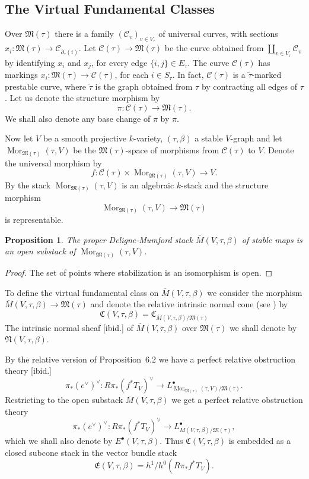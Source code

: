 \documentclass[11pt]{article}
\newcommand{\CC}{\mathfrak{C}}
\newcommand{\EE}{\mathfrak{E}}
\newcommand{\MM}{\mathfrak{M}}
\DeclareMathOperator{\Mor}{Mor}
\newcommand{\NN}{\mathfrak{N}}
\newcommand{\cC}{\mathcal{C}}
\newcommand{\com}{^{\scriptscriptstyle\bullet}}
\newcommand{\del}{\partial}
\newcommand{\dual}[1]{{{#1}^{\vee}}}
\newcommand{\lst}{_{\ast}}
\newcommand{\ol}{\overline}
\renewcommand{\t}{_{\tau}}
\renewcommand{\tilde}{\widetilde}
\newcommand{\upst}{^{\ast}}
\theoremstyle{plain}
\newtheorem{prop}{Proposition}
\theoremstyle{remark}
\newenvironment{pf}{\begin{proof}}{\end{proof}}
\theoremstyle{plain}
\theoremstyle{definition}
\theoremstyle{remark}
\begin{document}
\subsection{The Virtual Fundamental Classes}

Over \(\MM(\tau)\) there is a family \((\cC_v)_{v\in V_{\tau}}\) of universal
curves, with sections
\(x_i:\MM(\tau)\rightarrow\cC_{\del\t(i)}\). Let \(\cC(\tau)\rightarrow\MM(\tau)\)
be the curve obtained from \(\coprod_{v\in V\t}\cC_v\) by identifying \(x_i\) and
\(x_j\), for every edge \(\{i,j\}\in E\t\). The curve \(\cC(\tau)\) has markings
\(x_i:\MM(\tau)\rightarrow\cC(\tau)\), for each \(i\in S\t\). In fact,
\(\cC(\tau)\) is a \(\tilde{\tau}\)-marked prestable curve, where \(\tilde{\tau}\) is
the graph obtained from \(\tau\) by contracting all edges of \(\tau\). Let us
denote
the structure morphism by
\[
\pi:\cC(\tau)\longrightarrow\MM(\tau).
\]
We shall also denote any base change
of \(\pi\) by \(\pi\).

Now let \(V\) be a smooth projective \(k\)-variety, \((\tau,\beta)\) a stable
\(V\)-graph and let
\(\Mor_{\MM(\tau)}(\tau,V)\) be the \(\MM(\tau)\)-space of morphisms
{}from \(\cC(\tau)\) to
\(V\). Denote the universal morphism by
\[
f:\cC(\tau)\times\Mor_{\MM(\tau)}(\tau,V)\longrightarrow V.
\]
By
\cite{fgaIV} the stack \(\Mor_{\MM(\tau)}(\tau,V)\) is an algebraic
\(k\)-stack and the
structure morphism
\[
\Mor_{\MM(\tau)}(\tau,V)\longrightarrow \MM(\tau)
\]
is
representable.

\begin{prop}\label{prop:OpenSubstack}
The proper Deligne-Mumford stack \(\ol{M}(V,\tau,\beta)\) of stable maps
is an open substack of \(\Mor_{\MM(\tau)}(\tau,V)\).
\end{prop}
\begin{pf}
The set of points where stabilization is an isomorphism is open.
\end{pf}

To define the virtual fundamental class on \(\ol{M}(V,\tau,\beta)\) we
consider the morphism \(\ol{M}(V,\tau,\beta)\rightarrow\MM(\tau)\) and
denote the relative intrinsic normal cone (see \cite{BF}) by
\[
\CC(V,\tau,\beta)=\CC_{\ol{M}(V,\tau,\beta)/\MM(\tau)}
\]
The
intrinsic normal sheaf [ibid.] of \(\ol{M}(V,\tau,\beta)\) over
\(\MM(\tau)\) we shall denote by \(\NN(V,\tau,\beta)\).

By the relative version of \cite{BF} Proposition~6.2 we have a perfect
relative obstruction theory [ibid.]
\[
\dual{\pi\lst(\dual{e})}:\dual{R\pi\lst(f\upst T_V)}\longrightarrow
L_{\Mor_{\MM(\tau)}(\tau,V)/\MM(\tau)}\com.
\]
Restricting to the open
substack \(\ol{M}(V,\tau,\beta)\) we get a perfect relative obstruction theory
\[
\dual{\pi\lst(\dual{e})}:\dual{R\pi\lst(f\upst T_V)}\longrightarrow
L_{\ol{M}(V,\tau,\beta)/\MM(\tau)}\com,
\]
which we shall also denote by \(E\com(V,\tau,\beta)\).
Thus \(\CC(V,\tau,\beta)\) is embedded as a closed subcone stack in the
vector bundle stack
\[
\EE(V,\tau,\beta)=h^1/h^0(R\pi\lst f\upst
T_V).
\]
\end{document}
